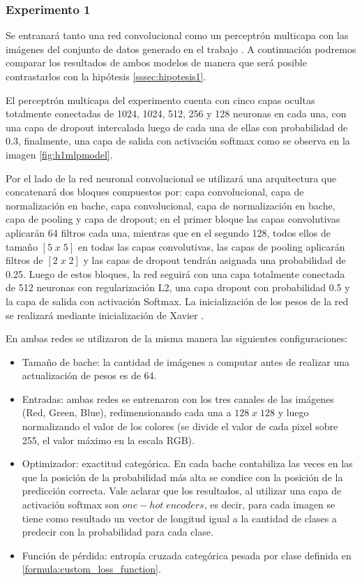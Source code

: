 \subsubsection{Experimento 1} \label{sssec:exp1}
Se entranará tanto una red convolucional como un perceptrón multicapa con las imágenes del conjunto de datos generado en el trabajo \cite{vision_based_real_estate_price_estimation}. A continuación podremos comparar los resultados de ambos modelos de manera que será posible contrastarlos con la hipótesis \ref{sssec:hipotesis1}.

El perceptrón multicapa del experimento cuenta con cinco capas ocultas totalmente conectadas de 1024, 1024, 512, 256 y 128 neuronas en cada una, con una capa de dropout intercalada luego de cada una de ellas con probabilidad de 0.3, finalmente, una capa de salida con activación softmax como se observa en la imagen \ref{fig:h1mlpmodel}. 


Por el lado de la red neuronal convolucional se utilizará una arquitectura que concatenará dos bloques compuestos por: capa convolucional, capa de normalización en bache, capa convolucional, capa de normalización en bache, capa de pooling y capa de dropout; en el primer bloque las capas convolutivas aplicarán 64 filtros cada una, mientras que en el segundo 128, todos ellos de tamaño \([5\;x\;5]\) en todas las capas convolutivas, las capas de pooling aplicarán filtros de \([2\;x\;2]\) y las capas de dropout tendrán asignada una probabilidad de 0.25. Luego de estos bloques, la red seguirá con una capa totalmente conectada de 512 neuronas con regularización L2, una capa dropout con probabilidad 0.5 y la capa de salida con activación Softmax. La inicialización de los pesos de la red se realizará mediante inicialización de Xavier \cite{glorot2010understanding}. 

En ambas redes se utilizaron de la misma manera las siguientes configuraciones: 
\begin{itemize}
	\item Tamaño de bache: la cantidad de imágenes a computar antes de realizar una actualización de pesos es de 64.
	\item Entradas: ambas redes se entrenaron con los tres canales de las imágenes (Red, Green, Blue), redimensionando cada una a \(128\; x\; 128\) y luego normalizando el valor de los colores (se divide el valor de cada pixel sobre 255, el valor máximo en la escala RGB).
	\item Optimizador: exactitud categórica. En cada bache contabiliza las veces en las que la posición de la probabilidad más alta se condice con la posición de la predicción correcta. Vale aclarar que los resultados, al utilizar una capa de activación softmax son \(one-hot\; encoders\), es decir, para cada imagen se tiene como resultado un vector de longitud igual a la cantidad de clases a predecir con la probabilidad para cada clase. 
	\item Función de pérdida: entropía cruzada categórica pesada por clase definida en  \ref{formula:custom_loss_function}.
\end{itemize}

